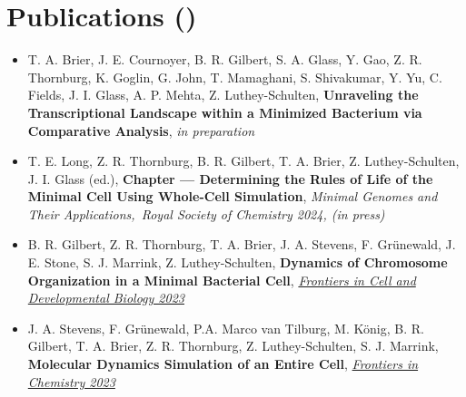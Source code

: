 \documentclass[letterpaper,10pt]{article}
\newcommand{\sectionspace}{
\vspace{-17pt}
}
\newcommand{\subheadingtitlevspace}{
\vspace{-3pt}
}
\newcommand{\resumeSubHeadingListStart}{\subheadingtitlevspace\begin{itemize}[leftmargin=0.15in, label={}]}
\begin{document}
\sectionspace
\vspace{9pt}
\section{\textcolor{color1}{Publications {\normalsize (})}}

\begin{itemize}[leftmargin=0.35in, label={}, labelindent=5pt,itemindent=-15pt]
  \setlength\itemsep{-0.4em}
  
\item \textcolor{color1}{T. A. Brier}, J. E. Cournoyer, B. R. Gilbert, S. A. Glass, Y. Gao, Z. R. Thornburg, K. Goglin, G. John, T. Mamaghani, S. Shivakumar,   Y. Yu, C. Fields, J. I. Glass, A. P. Mehta, Z. Luthey-Schulten, \textbf{Unraveling the Transcriptional Landscape within a Minimized Bacterium via Comparative Analysis}, \textit{in preparation}

\item T. E. Long, Z. R. Thornburg, B. R. Gilbert, \textcolor{color1}{T. A. Brier}, Z. Luthey-Schulten, J. I. Glass (ed.), \textbf{Chapter --- Determining the Rules of Life of the Minimal Cell Using Whole-Cell Simulation}, \textit{Minimal Genomes and Their Applications,~Royal Society of Chemistry 2024, (in press)}

\item B. R. Gilbert, Z. R. Thornburg, \textcolor{color1}{T. A. Brier}, J. A. Stevens, F. Gr\"{u}newald, J. E. Stone, S. J. Marrink, Z. Luthey-Schulten, \textbf{Dynamics of Chromosome Organization in a Minimal Bacterial Cell}, \href{https://doi.org/10.3389/fcell.2023.1214962}{\textit{Frontiers in Cell and Developmental Biology 2023}}%

\item J. A. Stevens, F. Gr\"{u}newald, P.A. Marco van Tilburg, M. K\"{o}nig, B. R. Gilbert, \textcolor{color1}{T. A. Brier}, Z. R. Thornburg, Z. Luthey-Schulten, S. J. Marrink, \textbf{Molecular Dynamics Simulation of an Entire Cell}, \href{https://doi.org/10.3389/fchem.2023.1106495}{\textit{Frontiers in Chemistry 2023}}%


\end{itemize}
\end{document}
